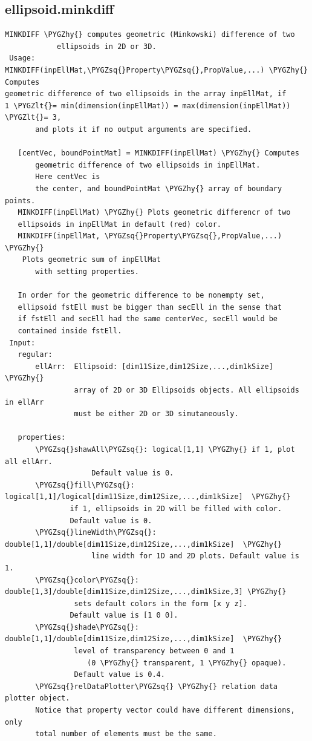 \documentclass[letterpaper,10pt,english]{sphinxmanual}
\def\PYGZlt{\char`\<}
\def\PYGZhy{\char`\-}
\def\PYGZsq{\char`\'}
\begin{document}
\subsection{ellipsoid.minkdiff}
\label{chap_functions:ellipsoid-minkdiff}
\begin{Verbatim}[commandchars=\\\{\}]
MINKDIFF \PYGZhy{} computes geometric (Minkowski) difference of two
            ellipsoids in 2D or 3D.
 Usage:
MINKDIFF(inpEllMat,\PYGZsq{}Property\PYGZsq{},PropValue,...) \PYGZhy{} Computes
geometric difference of two ellipsoids in the array inpEllMat, if
1 \PYGZlt{}= min(dimension(inpEllMat)) = max(dimension(inpEllMat)) \PYGZlt{}= 3,
       and plots it if no output arguments are specified.

   [centVec, boundPointMat] = MINKDIFF(inpEllMat) \PYGZhy{} Computes
       geometric difference of two ellipsoids in inpEllMat.
       Here centVec is
       the center, and boundPointMat \PYGZhy{} array of boundary points.
   MINKDIFF(inpEllMat) \PYGZhy{} Plots geometric differencr of two
   ellipsoids in inpEllMat in default (red) color.
   MINKDIFF(inpEllMat, \PYGZsq{}Property\PYGZsq{},PropValue,...) \PYGZhy{}
    Plots geometric sum of inpEllMat
       with setting properties.

   In order for the geometric difference to be nonempty set,
   ellipsoid fstEll must be bigger than secEll in the sense that
   if fstEll and secEll had the same centerVec, secEll would be
   contained inside fstEll.
 Input:
   regular:
       ellArr:  Ellipsoid: [dim11Size,dim12Size,...,dim1kSize] \PYGZhy{}
                array of 2D or 3D Ellipsoids objects. All ellipsoids in ellArr
                must be either 2D or 3D simutaneously.

   properties:
       \PYGZsq{}shawAll\PYGZsq{}: logical[1,1] \PYGZhy{} if 1, plot all ellArr.
                    Default value is 0.
       \PYGZsq{}fill\PYGZsq{}: logical[1,1]/logical[dim11Size,dim12Size,...,dim1kSize]  \PYGZhy{}
               if 1, ellipsoids in 2D will be filled with color.
               Default value is 0.
       \PYGZsq{}lineWidth\PYGZsq{}: double[1,1]/double[dim11Size,dim12Size,...,dim1kSize]  \PYGZhy{}
                    line width for 1D and 2D plots. Default value is 1.
       \PYGZsq{}color\PYGZsq{}: double[1,3]/double[dim11Size,dim12Size,...,dim1kSize,3] \PYGZhy{}
                sets default colors in the form [x y z].
               Default value is [1 0 0].
       \PYGZsq{}shade\PYGZsq{}: double[1,1]/double[dim11Size,dim12Size,...,dim1kSize]  \PYGZhy{}
                level of transparency between 0 and 1
                   (0 \PYGZhy{} transparent, 1 \PYGZhy{} opaque).
                Default value is 0.4.
       \PYGZsq{}relDataPlotter\PYGZsq{} \PYGZhy{} relation data plotter object.
       Notice that property vector could have different dimensions, only
       total number of elements must be the same.


\end{Verbatim}
\end{document}
